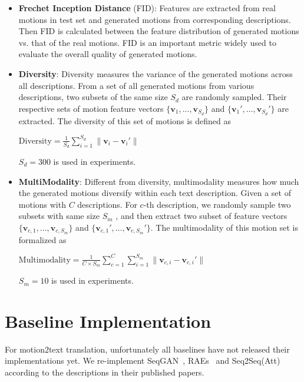 \documentclass[runningheads]{llncs}
\newcommand{\beforesection}{\vspace{-2mm}}
\newcommand{\aftersection}{\vspace{-2mm}}
\begin{document}
\begin{itemize}
    \item \textbf{Frechet Inception Distance} (FID): Features are extracted from real motions in test set and generated motions from corresponding descriptions. Then FID is calculated between the feature distribution of generated motions vs. that of the real motions. FID is an important metric widely used to evaluate the overall quality of generated motions.
    \item \textbf{Diversity}: Diversity measures the variance of the generated motions across all descriptions. From a set of all generated motions from various descriptions, two subsets of the same size $S_d$ are randomly sampled. Their respective sets of motion feature vectors $\{\mathbf{v}_1 , ..., \mathbf{v}_{S_d}\}$ and $\{\mathbf{v}_1' , ..., \mathbf{v}_{S_d}'\}$ are extracted. The diversity of this set of motions is defined as
    
    $\mathrm{Diversity}=\frac{1}{S_d}\sum_{i=1}^{S_d}\|\mathbf{v}_i-\mathbf{v}_i'\|$
    
    $S_d=300$ is used in experiments.
    \item \textbf{MultiModality}: Different from diversity, multimodality measures how much the generated motions diversify within each text description. Given a set of motions with $C$ descriptions. For $c$-th description, we randomly sample two subsets with same size $S_m$ , and then extract two subset of feature vectors $\{\mathbf{v}_{c,1}, ... , \mathbf{v}_{c,S_m} \}$ and $\{\mathbf{v}_{c,1}', ... , \mathbf{v}_{c,S_m}' \}$. The multimodality of this motion set is formalized as
    
    $\mathrm{Multimodality}=\frac{1}{C\times S_m}\sum_{c=1}^C\sum_{i=1}^{S_m}\|\mathbf{v}_{c,i}-\mathbf{v}_{c,i}'\|$
    
    $S_m=10$ is used in experiments.
    
\end{itemize}

\beforesection
\section{Baseline Implementation}
\aftersection
For motion2text translation, unfortunately all baselines have not released their implementations yet. We re-implement SeqGAN~\cite{goutsu2021linguistic}, RAEs~\cite{yamada2018paired} and Seq2Seq(Att)~\cite{plappert2018learning} according to the descriptions in their published papers.
\end{document}
